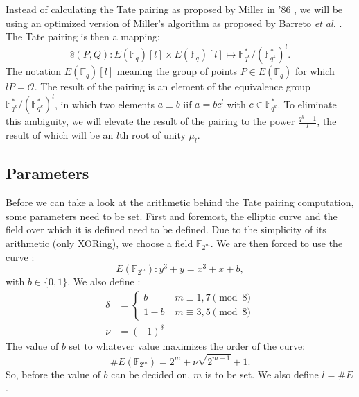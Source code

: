 Instead of calculating the Tate pairing as proposed by Miller in '86 \cite{miller}, we will be using an optimized version of Miller's algorithm as proposed by Barreto \emph{et al.} \cite{barreto-efficient}. The Tate pairing is then a mapping:
\begin{displaymath}
\hat{e}(P, Q) : E(\mathbb{F}_q) [l] \times E(\mathbb{F}_q) [l] \mapsto \mathbb{F}_{q^k}^*/(\mathbb{F}_{q^k}^*)^l.
\end{displaymath}
The notation $E(\mathbb{F}_q) [l]$ meaning the group of points $P \in E(\mathbb{F}_q)$ for which $l P = \mathcal{O}$. The result of the pairing is an element of the equivalence group $\mathbb{F}_{q^k}^*/(\mathbb{F}_{q^k}^*)^l$, in which two elements $a \equiv b$ iif $a = bc^l$ with $c \in \mathbb{F}_{q^k}^*$. To eliminate this ambiguity, we will elevate the result of the pairing to the power $\frac{q^k - 1}{l}$, the result of which will be an $l$th root of unity $\mu_l$.

\subsection{Parameters}

Before we can take a look at the arithmetic behind the Tate pairing computation, some parameters need to be set. First and foremost, the elliptic curve and the field over which it is defined need to be defined. Due to the simplicity of its arithmetic (only XORing), we choose a field $\mathbb{F}_{2^m}$. We are then forced to use the curve \cite{barreto-efficient}:
\begin{displaymath}
E(\mathbb{F}_{2^m}) : y^3 + y = x^3 + x + b,
\end{displaymath}
with $b \in \{0,1\}$. We also define \cite{beuchat}:
\begin{displaymath}\begin{aligned}
\delta	&= \begin{cases}
				b		\qquad &m \equiv 1, 7 \pmod 8\\
				1 - b			&m \equiv 3, 5	\pmod 8
				\end{cases}\\
\nu		&= (-1)^{\delta}
\end{aligned}\end{displaymath}
The value of $b$ set to whatever value maximizes the order of the curve:
\begin{displaymath}
\#E(\mathbb{F}_{2^m}) = 2^m + \nu \sqrt{2^{m+1}} + 1.
\end{displaymath}
So, before the value of $b$ can be decided on, $m$ is to be set. We also define $l = \#E$.


